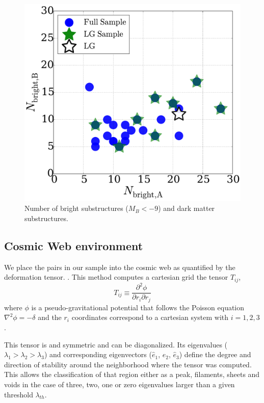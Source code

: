 \begin{figure}
\includegraphics[width=\hsize]{n_structure.pdf}
\caption{Number of bright substructures ($M_{B}<-9$) and dark matter
  substructures.}
\label{fig:nstructure}
\end{figure}


\subsection{Cosmic Web environment}
We place the pairs in our sample into the cosmic web as quantified by
the deformation tensor.
\citep{2007MNRAS.375..489H,2009MNRAS.396.1815F}.
This method computes a cartesian grid the tensor $T_{ij}$,
\begin{equation}
T_{ij} \equiv \frac{\partial^2\phi}{\partial r_i \partial r_j}
\end{equation}
%
where $\phi$ is a pseudo-gravitational potential that follows the
Poisson equation $\nabla^2\phi=-\delta$ and the $r_i$ coordinates
correspond to a cartesian system with $i=1,2,3$. 

This tensor is and symmetric and can be diagonalized.
Its eigenvalues ($\lambda_1 > \lambda_2 > \lambda_3$) and
corresponding eigenvectors ($\hat{e}_1$, $\hat{e}_2$, $\hat{e}_3$)
define the degree and direction of stability around the neighborhood
where the tensor was computed. 
This allows the classification of that region either as a peak,
filaments, sheets and voids in the case of three, two, one or zero
eigenvalues larger than a given threshold $\lambda_{th}$.

